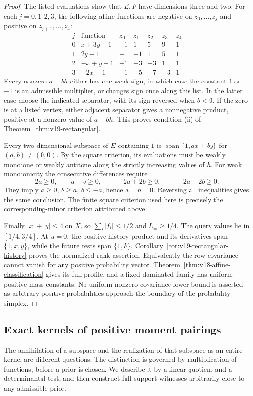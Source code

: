 \begin{proof}
The listed evaluations show that $E,F$ have dimensions three and two.
For each $j=0,1,2,3$, the following affine functions are negative on
$z_0,\ldots,z_j$ and positive on $z_{j+1},\ldots,z_4$:
\[
 \begin{array}{c|c|rrrrr}
 j&\text{function}&z_0&z_1&z_2&z_3&z_4\\\hline
 0&x+3y-1&-1&1&5&9&1\\
 1&2y-1&-1&-1&1&5&1\\
 2&-x+y-1&-1&-3&-3&1&1\\
 3&-2x-1&-1&-5&-7&-3&1
 \end{array}
\]
Every nonzero $a+bh$ either has one weak sign, in which case the
constant $1$ or $-1$ is an admissible multiplier, or changes sign once
along this list. In the latter case choose the indicated separator,
with its sign reversed when $b<0$. If the zero is at a listed vertex,
either adjacent separator gives a nonnegative product, positive at a
nonzero value of $a+bh$. This proves condition (ii) of
Theorem~\ref{thm:v19-rectangular}.

Every two-dimensional subspace of $E$ containing $1$ is
$\operatorname{span}\{1,ax+by\}$ for $(a,b)\ne(0,0)$.
By the square criterion, its evaluations must be weakly monotone or
weakly antitone along the strictly increasing values of $h$.
For weak monotonicity the consecutive differences require
\[
 2a\ge0,\qquad a+b\ge0,\qquad -2a+2b\ge0,
 \qquad -2a-2b\ge0.
\]
They imply $a\ge0$, $b\ge a$, $b\le-a$, hence $a=b=0$.
Reversing all inequalities gives the same conclusion. The finite
square criterion used here is precisely the corresponding-minor
criterion attributed above.

Finally $|x|+|y|\le4$ on $X$, so $\sum_i|f_i|\le1/2$ and
$L_\pm\ge1/4$. The query values lie in $[1/4,3/4]$.
At $u=0$, the positive history product and its derivatives span
$\{1,x,y\}$, while the future tests span $\{1,h\}$.
Corollary~\ref{cor:v19-rectangular-history} proves the normalized
rank assertion. Equivalently the row covariance cannot vanish for
any positive probability vector. Theorem~\ref{thm:v18-affine-classification}
gives its full profile, and a fixed dominated family has uniform
positive mass constants. No uniform nonzero covariance lower bound
is asserted as arbitrary positive probabilities approach the boundary
of the probability simplex.
\end{proof}


\subsection{Exact kernels of positive moment pairings}
\label{sec:exact-kernels}
The annihilation of a subspace and the realization of that subspace as
an entire kernel are different questions. The distinction is governed
by multiplication of functions, before a prior is chosen. We describe
it by a linear quotient and a determinantal test, and then construct
full-support witnesses arbitrarily close to any admissible prior.

